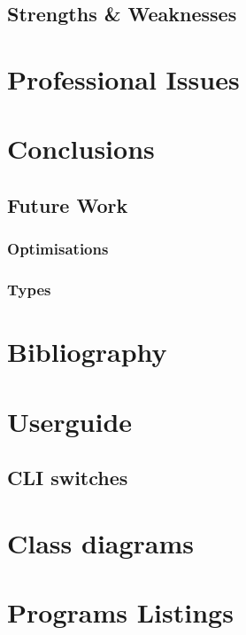 \documentclass[11pt]{report}
\begin{document}
\section{Strengths \& Weaknesses}

\chapter{Professional Issues}

\chapter{Conclusions}
\section{Future Work}
\subsection{Optimisations}
\subsection{Types}

\chapter{Bibliography}

\begin{appendices}

\chapter{Userguide}
\section{CLI switches}

\chapter{Class diagrams}

\chapter{Programs Listings}

\end{appendices}
\end{document}
